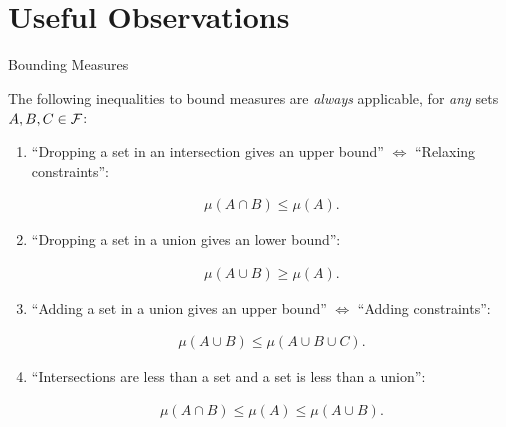 
\section{Useful Observations}

\begin{observation}{}{Bounding Measures}

    The following inequalities to bound measures are \emph{always} applicable, for \emph{any} sets $A, B, C \in \mathcal{F}$:

    \begin{enumerate}
        \setlength{\parskip}{0em}
        \item ``Dropping a set in an intersection gives an upper bound'' $\Leftrightarrow$ ``Relaxing constraints'':

            \begin{align*}
                \mu(A \cap B) \leq \mu(A).
            \end{align*}
        \item ``Dropping a set in a union gives an lower bound'':

            \begin{align*}
                \mu(A \cup B) \geq \mu(A).
            \end{align*}
        \item ``Adding a set in a union gives an upper bound'' $\Leftrightarrow$ ``Adding constraints'':

            \begin{align*}
                \mu(A \cup B) \leq \mu(A \cup B \cup C).
            \end{align*}
        \item ``Intersections are less than a set and a set is less than a union'':

            \begin{align*}
                \mu(A \cap B) \leq \mu(A) \leq \mu(A \cup B).
            \end{align*}
    \end{enumerate}

\end{observation}

